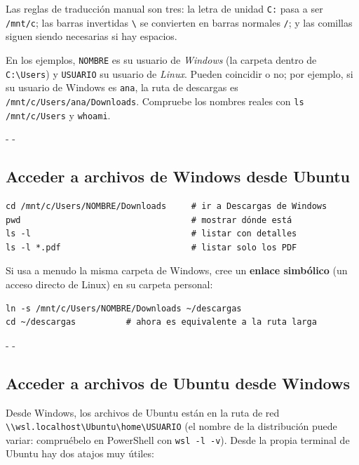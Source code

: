 \documentclass[11pt,a4paper]{article}
\makeatletter
\newcommand{\necesitaespacio}[1]{\par\penalty-100\begingroup
	\setlength{\dimen@}{#1}\dimen@ii\pagegoal\advance\dimen@ii-\pagetotal
	\ifdim\dimen@>\dimen@ii\ifdim\dimen@ii>\z@\vfil\fi\penalty-\@M\fi\endgroup}
\newcommand{\cmd}[1]{\texttt{\textcolor{colcmd}{#1}}}      %
\newcommand{\arch}[1]{\texttt{\textcolor{colarch}{#1}}}    %
\newcommand{\bs}{\textbackslash{}}    %
\makeatother
\begin{document}
	Las reglas de traducción manual son tres: la letra de unidad \arch{C:} pasa a ser \arch{/mnt/c}; las barras invertidas \arch{\bs} se convierten en barras normales \arch{/}; y las comillas siguen siendo necesarias si hay espacios.
	
	\begin{nota}
		En los ejemplos, \texttt{NOMBRE} es su usuario de \emph{Windows} (la carpeta dentro de \arch{C:\bs{}Users}) y \texttt{USUARIO} su usuario de \emph{Linux}. Pueden coincidir o no; por ejemplo, si su usuario de Windows es \texttt{ana}, la ruta de descargas es \arch{/\allowbreak{}mnt/\allowbreak{}c/\allowbreak{}Users/\allowbreak{}ana/\allowbreak{}Downloads}. Compruebe los nombres reales con \cmd{ls /\allowbreak{}mnt/\allowbreak{}c/\allowbreak{}Users} y \cmd{whoami}.
	\end{nota}
	
	\necesitaespacio{8\baselineskip}
	\subsection{Acceder a archivos de Windows desde Ubuntu}
	
	\begin{lstlisting}
cd /mnt/c/Users/NOMBRE/Downloads     # ir a Descargas de Windows
pwd                                  # mostrar dónde está
ls -l                                # listar con detalles
ls -l *.pdf                          # listar solo los PDF
\end{lstlisting}
	
	Si usa a menudo la misma carpeta de Windows, cree un \textbf{enlace simbólico} (un acceso directo de Linux) en su carpeta personal:
	\newpage
	
	\begin{lstlisting}
ln -s /mnt/c/Users/NOMBRE/Downloads ~/descargas
cd ~/descargas          # ahora es equivalente a la ruta larga
\end{lstlisting}
	
	\necesitaespacio{8\baselineskip}
	\subsection{Acceder a archivos de Ubuntu desde Windows}
	
	Desde Windows, los archivos de Ubuntu están en la ruta de red \arch{\bs\bs{}\allowbreak{}wsl.localhost\bs{}\allowbreak{}Ubuntu\bs{}\allowbreak{}home\bs{}\allowbreak{}USUARIO} (el nombre de la distribución puede variar: compruébelo en PowerShell con \cmd{wsl -l -v}). Desde la propia terminal de Ubuntu hay dos atajos muy útiles:
	
\end{document}
